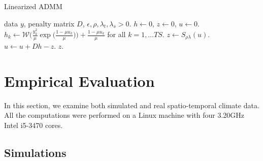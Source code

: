 \documentclass[letterpaper]{article} %
\newcommand{\norm}[1]{\left\lVert #1 \right\rVert}
\begin{document}
\begin{algorithm}[tb]
  \caption{Linearized ADMM }
  \label{alg:linADMM}
  \begin{algorithmic}[1]
     data $y$, penalty matrix $D$, 
    $\epsilon, \rho,\lambda_t,\lambda_s >0$.
     $h\leftarrow 0$, $z\leftarrow 0$, $u\leftarrow
    0$.  
    \REPEAT
    \STATE $h_k\leftarrow \mathscr{W}\bigg(\frac{y_k^2}{\mu} 
    \exp\bigg(\frac{1-\mu u_k}{\mu}\bigg) \bigg) + \frac{1-\mu
      u_k}{\mu}$ for all $k=1,\ldots TS$. 
    \STATE $z\leftarrow S_{\rho\lambda}(u)$. 
    \STATE $u\leftarrow u + Dh-z$. 
    \UNTIL {$\max\{\norm{Dh-z},\; \norm{z^{m+1}-z^m}\} < \epsilon$}
     $z$.
  \end{algorithmic}
\end{algorithm}





\section{Empirical Evaluation}
\label{sec:empirical-evaluation}

In this section, we examine both simulated and real spatio-temporal
climate data. All the computations were performed on a Linux machine
with four 3.20GHz Intel i5-3470 cores. 

\subsection{Simulations}
\label{sec:simulations}
\end{document}
